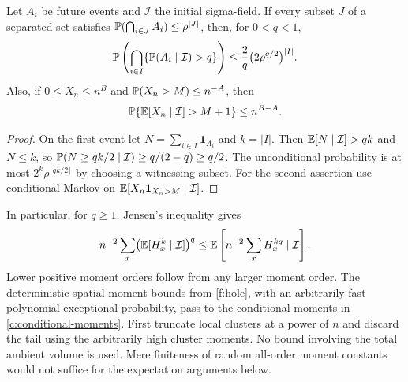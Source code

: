 \begin{lemma}\label{c:conditional}
Let $A_i$ be future events and $\mathcal I$ the initial sigma-field.
If every subset $J$ of a separated set satisfies
$\mathbb P(\bigcap_{i\in J}A_i)\le\rho^{|J|}$, then, for $0<q<1$,
\[
 \mathbb P\left(\bigcap_{i\in I}
 \{\mathbb P(A_i\mid\mathcal I)>q\}\right)
 \le \frac{2}{q}\bigl(2\rho^{q/2}\bigr)^{|I|}.
\]
Also, if $0\le X_n\le n^B$ and
$\mathbb P(X_n>M)\le n^{-A}$, then
\[
 \mathbb P\{\mathbb E[X_n\mid\mathcal I]>M+1\}\le n^{B-A}.
\]
\end{lemma}
\begin{proof}
On the first event let $N=\sum_{i\in I}\mathbf1_{A_i}$ and $k=|I|$.
Then $\mathbb E[N\mid\mathcal I]>qk$ and $N\le k$, so
$\mathbb P(N\ge qk/2\mid\mathcal I)\ge q/(2-q)\ge q/2$.
The unconditional probability is at most
$2^k\rho^{\lceil qk/2\rceil}$ by choosing a witnessing subset.
For the second assertion use conditional Markov on
$\mathbb E[X_n\mathbf1_{X_n>M}\mid\mathcal I]$.
\end{proof}

In particular, for $q\ge1$, Jensen's inequality gives
\begin{equation}\label{c:conditional-moments}
 n^{-2}\sum_x\bigl(\mathbb E[H_x^k\mid\mathcal I]\bigr)^q
 \le\mathbb E\left[n^{-2}\sum_xH_x^{kq}\mid\mathcal I\right].
\end{equation}
Lower positive moment orders follow from any larger moment order.
The deterministic spatial moment bounds from \ref{f:hole}, with an
arbitrarily fast polynomial exceptional probability, pass to the
conditional moments in \eqref{c:conditional-moments}. First truncate
local clusters at a power of $n$ and discard the tail using the
arbitrarily high cluster moments. No bound involving the total ambient
volume is used. Mere finiteness of random all-order moment constants
would not suffice for the expectation arguments below.

